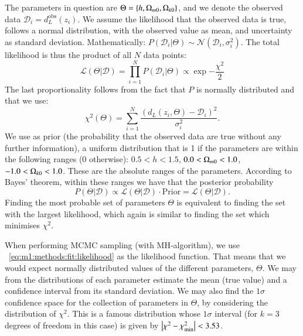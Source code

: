     The parameters in question are $\Theta = \{h, \Omega_{m0}, \Omega_{k0}\}$, and we denote the observed data $\mathcal{D}_i = d_L^\mathrm{obs}(z_i)$.
    We assume the likelihood that the observed data is true, follows a normal distribution, with the observed value as mean, and uncertainty as standard deviation. Mathematically: $P(\mathcal{D}_i|\Theta) \sim \mathcal{N}(\mathcal{D}_i, \sigma_i^2)$. The total likelihood is thus the product of all $N$ data points:
    \begin{equation}\label{eq:m1:methods:fit:likelihood}
        \mathcal{L}(\Theta|\mathcal{D}) = \prod_{i=1}^NP(\mathcal{D}_i|\Theta) \propto \exp{-\frac{\chi^2}{2}}
    \end{equation}
    The last proportionality follows from the fact that $P$ is normally distributed and that we use:
    \begin{equation}\label{eq:m1:methods:fit:chi2}
        \chi^2(\Theta) = \sum_{i=1}^N\frac{(d_L(z_i, \Theta)-\mathcal{D}_i)^2}{\sigma_i^2}.
    \end{equation}
    We use as prior (the probability that the observed data are true without any further information), a uniform distribution that is 1 if the parameters are within the following ranges (0 otherwise): $0.5 < h < 1.5$, $0.0 < \Omega_{m0} < 1.0$, $-1.0 < \Omega_{k0} < 1.0$. These are the absolute ranges of the parameters. According to Bayes' theorem, within these ranges we have that the posterior probability 
    \begin{equation}\label{eq:m1:methods:fit:posterior_prob}
        P(\Theta|\mathcal{D}) \propto \mathcal{L}(\Theta|\mathcal{D}) \cdot \mathrm{Prior} = \mathcal{L}(\Theta|\mathcal{D}). 
    \end{equation}
    Finding the most probable set of parameters $\Theta$ is equivalent to finding the set with the largest likelihood, which again is similar to finding the set which minimises $\chi^2$. 

    When performing MCMC sampling (with MH-algorithm), we use ~\cref{eq:m1:methods:fit:likelihood} as the likelihood function. That means that we would expect normally distributed values of the different parameters, $\Theta$. We may from the distributions of each parameter estimate the mean (true value) and a confidence interval from its standard deviation. We may also find the $1\sigma$ confidence space for the collection of parameters in $\Theta$, by considering the distribution of $\chi^2$. This is a famous distribution whose $1\sigma$ interval (for $k=3$ degrees of freedom in this case) is given by $\abs{\chi^2-\chi^2_\mathrm{min}} < 3.53$. 
    
